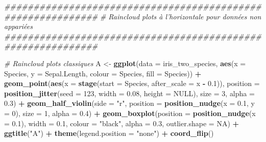 \documentclass[
  french,
]{book}
\newenvironment{Shaded}{\begin{snugshade}}{\end{snugshade}}
\newcommand{\CommentTok}[1]{\textcolor[rgb]{0.56,0.35,0.01}{\textit{#1}}}
\newcommand{\DataTypeTok}[1]{\textcolor[rgb]{0.13,0.29,0.53}{#1}}
\newcommand{\DecValTok}[1]{\textcolor[rgb]{0.00,0.00,0.81}{#1}}
\newcommand{\FloatTok}[1]{\textcolor[rgb]{0.00,0.00,0.81}{#1}}
\newcommand{\KeywordTok}[1]{\textcolor[rgb]{0.13,0.29,0.53}{\textbf{#1}}}
\newcommand{\NormalTok}[1]{#1}
\newcommand{\OperatorTok}[1]{\textcolor[rgb]{0.81,0.36,0.00}{\textbf{#1}}}
\newcommand{\OtherTok}[1]{\textcolor[rgb]{0.56,0.35,0.01}{#1}}
\newcommand{\StringTok}[1]{\textcolor[rgb]{0.31,0.60,0.02}{#1}}
\begin{document}
\begin{Shaded}
\begin{Highlighting}[]
\CommentTok{############################################################}
\CommentTok{# Raincloud plots à l'horizontale pour données non appariées}
\CommentTok{############################################################}


\CommentTok{# Raincloud plots classiques}
\NormalTok{A <-}
\StringTok{  }\KeywordTok{ggplot}\NormalTok{(}\DataTypeTok{data =}\NormalTok{ iris_two_species, }\KeywordTok{aes}\NormalTok{(}\DataTypeTok{x =}\NormalTok{ Species, }\DataTypeTok{y =}\NormalTok{ Sepal.Length, }
                                      \DataTypeTok{colour =}\NormalTok{ Species, }\DataTypeTok{fill =}\NormalTok{ Species)) }\OperatorTok{+}
\StringTok{  }\KeywordTok{geom_point}\NormalTok{(}\KeywordTok{aes}\NormalTok{(}\DataTypeTok{x =} \KeywordTok{stage}\NormalTok{(}\DataTypeTok{start =}\NormalTok{ Species, }\DataTypeTok{after_scale =}\NormalTok{ x }\OperatorTok{-}\StringTok{ }\FloatTok{0.1}\NormalTok{)),}
             \DataTypeTok{position =} \KeywordTok{position_jitter}\NormalTok{(}\DataTypeTok{seed =} \DecValTok{123}\NormalTok{, }\DataTypeTok{width =} \FloatTok{0.08}\NormalTok{, }\DataTypeTok{height =} \OtherTok{NULL}\NormalTok{),}
             \DataTypeTok{size =} \DecValTok{3}\NormalTok{, }\DataTypeTok{alpha =} \FloatTok{0.3}\NormalTok{) }\OperatorTok{+}
\StringTok{  }\KeywordTok{geom_half_violin}\NormalTok{(}\DataTypeTok{side =} \StringTok{"r"}\NormalTok{,}
                   \DataTypeTok{position =} \KeywordTok{position_nudge}\NormalTok{(}\DataTypeTok{x =} \FloatTok{0.1}\NormalTok{, }\DataTypeTok{y =} \DecValTok{0}\NormalTok{),}
                   \DataTypeTok{size =} \DecValTok{1}\NormalTok{, }\DataTypeTok{alpha =} \FloatTok{0.4}\NormalTok{) }\OperatorTok{+}
\StringTok{  }\KeywordTok{geom_boxplot}\NormalTok{(}\DataTypeTok{position =} \KeywordTok{position_nudge}\NormalTok{(}\DataTypeTok{x =} \FloatTok{0.1}\NormalTok{),}
               \DataTypeTok{width =} \FloatTok{0.1}\NormalTok{, }\DataTypeTok{colour =} \StringTok{"black"}\NormalTok{, }\DataTypeTok{alpha =} \FloatTok{0.3}\NormalTok{, }\DataTypeTok{outlier.shape =} \OtherTok{NA}\NormalTok{) }\OperatorTok{+}
\StringTok{  }\KeywordTok{ggtitle}\NormalTok{(}\StringTok{"A"}\NormalTok{) }\OperatorTok{+}
\StringTok{  }\KeywordTok{theme}\NormalTok{(}\DataTypeTok{legend.position =} \StringTok{"none"}\NormalTok{) }\OperatorTok{+}
\StringTok{  }\KeywordTok{coord_flip}\NormalTok{()}


\end{Highlighting}
\end{Shaded}
\end{document}
